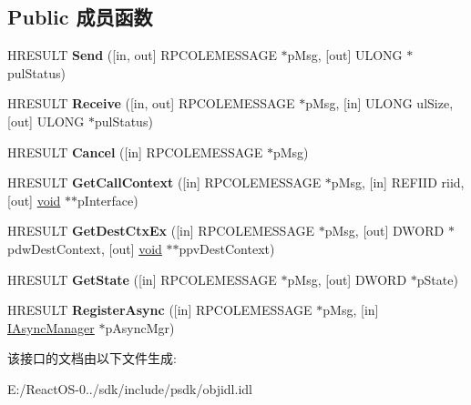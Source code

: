 \subsection*{Public 成员函数}
\begin{DoxyCompactItemize}
\item 
\mbox{\label{interface_i_rpc_channel_buffer3_ae9d18c20aca665992886595cf8922eb4}} 
H\+R\+E\+S\+U\+LT {\bfseries Send} (\mbox{[}in, out\mbox{]} R\+P\+C\+O\+L\+E\+M\+E\+S\+S\+A\+GE $\ast$p\+Msg, \mbox{[}out\mbox{]} U\+L\+O\+NG $\ast$pul\+Status)
\item 
\mbox{\label{interface_i_rpc_channel_buffer3_a877338f549307a009d6c7744537d51ad}} 
H\+R\+E\+S\+U\+LT {\bfseries Receive} (\mbox{[}in, out\mbox{]} R\+P\+C\+O\+L\+E\+M\+E\+S\+S\+A\+GE $\ast$p\+Msg, \mbox{[}in\mbox{]} U\+L\+O\+NG ul\+Size, \mbox{[}out\mbox{]} U\+L\+O\+NG $\ast$pul\+Status)
\item 
\mbox{\label{interface_i_rpc_channel_buffer3_a9e7ad9c28d56202aae95781efc4de3d1}} 
H\+R\+E\+S\+U\+LT {\bfseries Cancel} (\mbox{[}in\mbox{]} R\+P\+C\+O\+L\+E\+M\+E\+S\+S\+A\+GE $\ast$p\+Msg)
\item 
\mbox{\label{interface_i_rpc_channel_buffer3_adf47bd54c24e3d687ee66b731702e9f8}} 
H\+R\+E\+S\+U\+LT {\bfseries Get\+Call\+Context} (\mbox{[}in\mbox{]} R\+P\+C\+O\+L\+E\+M\+E\+S\+S\+A\+GE $\ast$p\+Msg, \mbox{[}in\mbox{]} R\+E\+F\+I\+ID riid, \mbox{[}out\mbox{]} \hyperlink{interfacevoid}{void} $\ast$$\ast$p\+Interface)
\item 
\mbox{\label{interface_i_rpc_channel_buffer3_ad658266da6c64343007805a52d996c59}} 
H\+R\+E\+S\+U\+LT {\bfseries Get\+Dest\+Ctx\+Ex} (\mbox{[}in\mbox{]} R\+P\+C\+O\+L\+E\+M\+E\+S\+S\+A\+GE $\ast$p\+Msg, \mbox{[}out\mbox{]} D\+W\+O\+RD $\ast$pdw\+Dest\+Context, \mbox{[}out\mbox{]} \hyperlink{interfacevoid}{void} $\ast$$\ast$ppv\+Dest\+Context)
\item 
\mbox{\label{interface_i_rpc_channel_buffer3_aea5449628a344a7f42d54c0bb22524eb}} 
H\+R\+E\+S\+U\+LT {\bfseries Get\+State} (\mbox{[}in\mbox{]} R\+P\+C\+O\+L\+E\+M\+E\+S\+S\+A\+GE $\ast$p\+Msg, \mbox{[}out\mbox{]} D\+W\+O\+RD $\ast$p\+State)
\item 
\mbox{\label{interface_i_rpc_channel_buffer3_adf7ca122ea10ff210e70262f075fece4}} 
H\+R\+E\+S\+U\+LT {\bfseries Register\+Async} (\mbox{[}in\mbox{]} R\+P\+C\+O\+L\+E\+M\+E\+S\+S\+A\+GE $\ast$p\+Msg, \mbox{[}in\mbox{]} \hyperlink{interface_i_async_manager}{I\+Async\+Manager} $\ast$p\+Async\+Mgr)
\end{DoxyCompactItemize}


该接口的文档由以下文件生成\+:\begin{DoxyCompactItemize}
\item 
E\+:/\+React\+O\+S-\/0../sdk/include/psdk/objidl.\+idl\end{DoxyCompactItemize}
